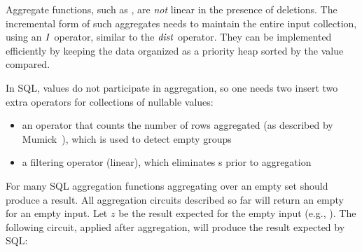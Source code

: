%

Aggregate functions, such as , are \emph{not} linear in the
presence of deletions.  The incremental form of such aggregates needs
to maintain the entire input collection, using an $\mathit{I}$ operator,
similar to the $\mathit{dist}$ operator.  They can be implemented
efficiently by keeping the data organized as a priority heap sorted by
the value compared.

In SQL,  values do not participate in aggregation, so one
needs two insert two extra operators for collections of nullable
values:
\begin{itemize}
  \item an operator that counts the number of rows aggregated (as
    described by Mumick~\cite{mumick-sigmod97}), which is used to
    detect empty groups
  \item a filtering operator (linear), which eliminates s
    prior to aggregation
\end{itemize}

For many SQL aggregation functions aggregating over an empty set
should produce a  result.  All aggregation circuits
described so far will return an empty \zr for an empty input.  Let $z$
be the result expected for the empty input (e.g., ).  The
following circuit, applied after aggregation, will produce the result
expected by SQL:

\begin{center}
\end{center}

